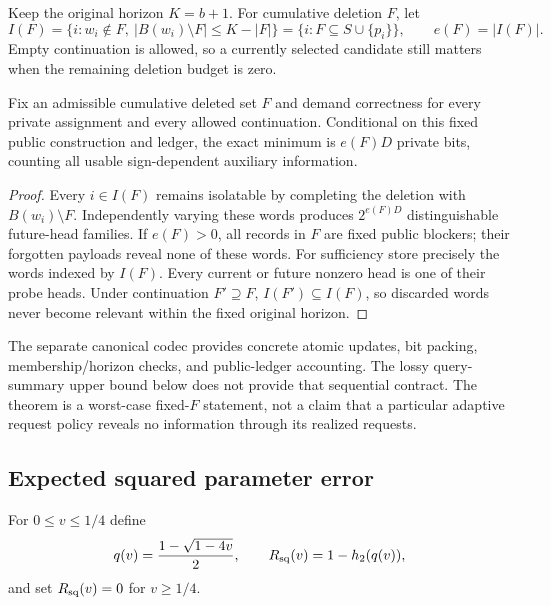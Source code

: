 Keep the original horizon $K=b+1$.  For cumulative deletion $F$, let
\[
 I(F)=\{i:w_i\notin F,\ |B(w_i)\setminus F|\le K-|F|\}
     =\{i:F\subseteq S\cup\{p_i\}\},\qquad e(F)=|I(F)|.
\]
Empty continuation is allowed, so a currently selected candidate still
matters when the remaining deletion budget is zero.

\begin{theorem}
Fix an admissible cumulative deleted set $F$ and demand correctness for
every private assignment and every allowed continuation.  Conditional on
this fixed public construction and ledger, the exact minimum is $e(F)D$
private bits, counting all usable sign-dependent auxiliary information.
\end{theorem}
\begin{proof}
Every $i\in I(F)$ remains isolatable by completing the deletion with
$B(w_i)\setminus F$.  Independently varying these words produces
$2^{e(F)D}$ distinguishable future-head families.  If $e(F)>0$, all records
in $F$ are fixed public blockers; their forgotten payloads reveal none of
these words.  For sufficiency store precisely the words indexed by $I(F)$.
Every current or future nonzero head is one of their probe heads.  Under
continuation $F'\supseteq F$, $I(F')\subseteq I(F)$, so discarded words
never become relevant within the fixed original horizon.
\end{proof}

The separate canonical codec provides concrete atomic updates, bit packing,
membership/horizon checks, and public-ledger accounting.  The lossy
query-summary upper bound below does not provide that sequential contract.
The theorem is a worst-case fixed-$F$ statement, not a claim that a
particular adaptive request policy reveals no information through its
realized requests.

\subsection{Expected squared parameter error}
For $0\le v\le1/4$ define
\[
 q(v)=\frac{1-\sqrt{1-4v}}2,\qquad
 R_{\rm sq}(v)=1-h_2(q(v)),
\]
and set $R_{\rm sq}(v)=0$ for $v\ge1/4$.

